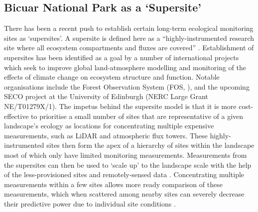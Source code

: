\begin{refsection}
\subsection{Bicuar National Park as a `Supersite'}

There has been a recent push to establish certain long-term ecological monitoring sites as `supersites'. A supersite is defined here as a ``highly-instrumented research site where all ecosystem compartments and fluxes are covered'' \citep{Mikkelsen2013}. Establishment of supersites has been identified as a goal by a number of international projects which seek to improve global land-atmosphere modelling and monitoring of the effects of climate change on ecosystem structure and function. Notable organisations include the Forest Observation System (FOS, \citealt{Chave2019}), and the upcoming SECO project at the University of Edinburgh (NERC Large Grant NE/T01279X/1). The impetus behind the supersite model is that it is more cost-effective to prioritise a small number of sites that are representative of a given landscape's ecology as locations for concentrating multiple expensive measurements, such as LiDAR and atmospheric flux towers. These highly-instrumented sites then form the apex of a hierarchy of sites within the landscape most of which only have limited monitoring measurements. Measurements from the supersites can then be used to `scale up' to the landscape scale with the help of the less-provisioned sites and remotely-sensed data \citep{Anderson2018}. Concentrating multiple measurements within a few sites allows more ready comparison of these measurements, which when scattered among nearby sites can severely decrease their predictive power due to individual site conditions \citep{Mikkelsen2013}.


\end{refsection}
